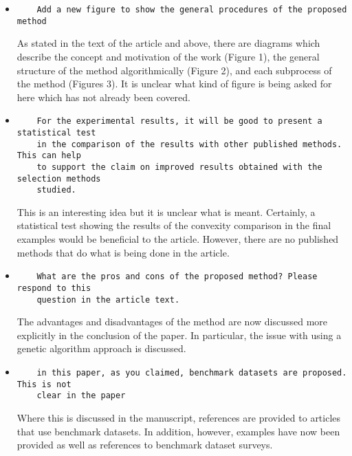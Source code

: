 \documentclass[11pt]{article}
\begin{document}
\begin{itemize}
\item
\begin{verbatim}
    Add a new figure to show the general procedures of the proposed method
\end{verbatim}

As stated in the text of the article and above, there are diagrams which
describe the concept and motivation of the work (Figure 1), the general
structure of the method algorithmically (Figure 2), and each subprocess of the
method (Figures 3). It is unclear what kind of figure is being asked for
here which has not already been covered.

\item
\begin{verbatim}
    For the experimental results, it will be good to present a statistical test
    in the comparison of the results with other published methods. This can help
    to support the claim on improved results obtained with the selection methods
    studied.
\end{verbatim}

This is an interesting idea but it is unclear what is meant. Certainly, a
statistical test showing the results of the convexity comparison in the final
examples would be beneficial to the article. However, there are no published
methods that do what is being done in the article.


\item
\begin{verbatim}
    What are the pros and cons of the proposed method? Please respond to this
    question in the article text.
\end{verbatim}

The advantages and disadvantages of the method are now discussed more explicitly
in the conclusion of the paper. In particular, the issue with using a genetic
algorithm approach is discussed.


\item
\begin{verbatim}
    in this paper, as you claimed, benchmark datasets are proposed. This is not
    clear in the paper
\end{verbatim}

Where this is discussed in the manuscript, references are provided to articles
that use benchmark datasets. In addition, however, examples have now been
provided as well as references to benchmark dataset surveys.


\end{itemize}
\end{document}
